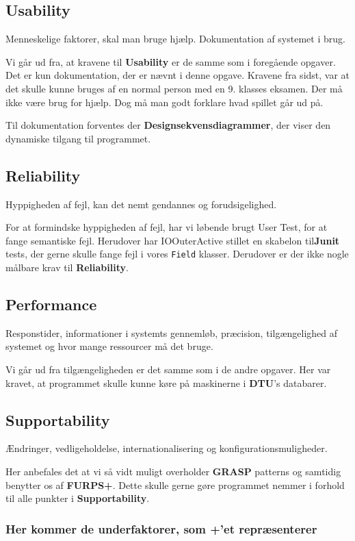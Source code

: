 \subsection{Usability}
Menneskelige faktorer, skal man bruge hjælp. Dokumentation af systemet i brug.


Vi går ud fra, at kravene til \textbf{Usability} er de samme som i foregående opgaver. Det er kun dokumentation, der er nævnt i denne opgave. Kravene fra sidst, var at det skulle kunne bruges af en normal person med en 9. klasses eksamen. Der må ikke være brug for hjælp. Dog må man godt forklare hvad spillet går ud på.

Til dokumentation forventes der \textbf{Designsekvensdiagrammer}, der viser den dynamiske tilgang til programmet.
\subsection{Reliability}
Hyppigheden af fejl, kan det nemt gendannes og forudsigelighed.


For at formindske hyppigheden af fejl, har vi løbende brugt User Test, for at fange semantiske fejl. Herudover har IOOuterActive stillet en skabelon til\textbf{Junit} tests, der gerne skulle fange fejl i vores \texttt{Field} klasser. Derudover er der ikke nogle målbare krav til \textbf{Reliability}.
\subsection{Performance}
Responstider, informationer i systemts gennemløb, præcision, tilgængelighed af systemet og hvor mange ressourcer må det bruge.


Vi går ud fra tilgængeligheden er det samme som i de andre opgaver. Her var kravet, at programmet skulle kunne køre på maskinerne i \textbf{DTU}'s databarer.
\subsection{Supportability}
Ændringer, vedligeholdelse, internationalisering og konfigurationsmuligheder.


Her anbefales det at vi så vidt muligt overholder \textbf{GRASP} patterns og samtidig benytter os af \textbf{FURPS+}. Dette skulle gerne gøre programmet nemmer i forhold til alle punkter i \textbf{Supportability}.
\subsubsection*{Her kommer de underfaktorer, som +'et repræsenterer}
